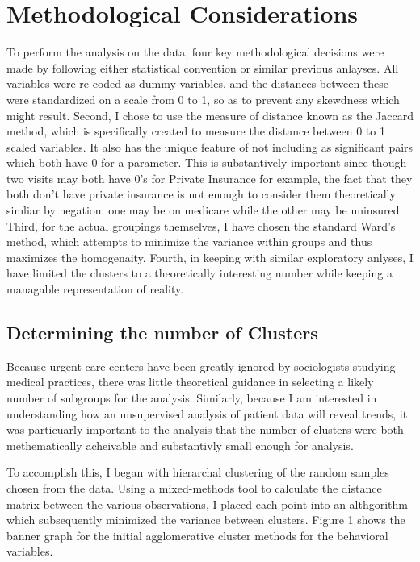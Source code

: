 \documentclass[12pt,twoside]{reedthesis}
\begin{document}
  \section*{Methodological
  Considerations}\label{methodological-considerations}
  
  To perform the analysis on the data, four key methodological decisions
  were made by following either statistical convention or similar previous
  anlayses. All variables were re-coded as dummy variables, and the
  distances between these were standardized on a scale from 0 to 1, so as
  to prevent any skewdness which might result. Second, I chose to use the
  measure of distance known as the Jaccard method, which is specifically
  created to measure the distance between 0 to 1 scaled variables. It also
  has the unique feature of not including as significant pairs which both
  have 0 for a parameter. This is substantively important since though two
  visits may both have 0's for Private Insurance for example, the fact
  that they both don't have private insurance is not enough to consider
  them theoretically simliar by negation: one may be on medicare while the
  other may be uninsured. Third, for the actual groupings themselves, I
  have chosen the standard Ward's method, which attempts to minimize the
  variance within groups and thus maximizes the homogenaity. Fourth, in
  keeping with similar exploratory anlyses, I have limited the clusters to
  a theoretically interesting number while keeping a managable
  representation of reality.
  
  \subsection*{Determining the number of
  Clusters}\label{determining-the-number-of-clusters}
  
  Because urgent care centers have been greatly ignored by sociologists
  studying medical practices, there was little theoretical guidance in
  selecting a likely number of subgroups for the analysis. Similarly,
  because I am interested in understanding how an unsupervised analysis of
  patient data will reveal trends, it was particuarly important to the
  analysis that the number of clusters were both methematically acheivable
  and substantivly small enough for analysis.
  
  To accomplish this, I began with hierarchal clustering of the random
  samples chosen from the data. Using a mixed-methods tool to calculate
  the distance matrix between the various observations, I placed each
  point into an althgorithm which subsequently minimized the variance
  between clusters. Figure 1 shows the banner graph for the initial
  agglomerative cluster methods for the behavioral variables.
  
\end{document}
